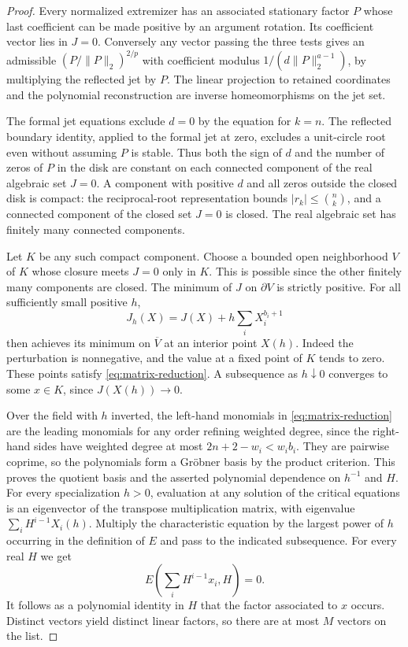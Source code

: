 \documentclass[11pt]{article}
\begin{document}
\begin{proof}
Every normalized extremizer has an associated stationary factor
\(P\) whose last coefficient can be made positive by an argument
rotation. Its coefficient vector lies in \(J=0\).
Conversely any vector passing the three tests gives an admissible
\((P/\|P\|_2)^{2/p}\) with coefficient modulus
\(1/(d\|P\|_2^{a-1})\), by multiplying the reflected jet by \(P\). The linear projection to retained coordinates and the polynomial reconstruction are inverse homeomorphisms on the jet set.

The formal jet equations exclude \(d=0\) by the equation for
\(k=n\). The reflected boundary identity, applied to the formal
jet at zero, excludes a unit-circle root even without assuming
\(P\) is stable. Thus both the sign of \(d\) and the number of
zeros of \(P\) in the disk are constant on each connected
component of the real algebraic set \(J=0\). A component with
positive \(d\) and all zeros outside the closed disk is compact:
the reciprocal-root representation bounds
\(\lvert r_k\rvert\leq\binom nk\), and a connected component
of the closed set \(J=0\) is closed. The real algebraic set has
finitely many connected components.

Let \(K\) be any such compact component. Choose a bounded open
neighborhood \(V\) of \(K\) whose closure meets \(J=0\) only in
\(K\). This is possible since the other finitely many components
are closed. The minimum of \(J\) on \(\partial V\) is strictly
positive. For all sufficiently small positive \(h\),
\[
 J_h(X)=J(X)+h\sum_i X_i^{b_i+1}
\]
then achieves its minimum on \(\overline V\) at an interior
point \(X(h)\). Indeed the perturbation is nonnegative, and the
value at a fixed point of \(K\) tends to zero. These points
satisfy \eqref{eq:matrix-reduction}. A subsequence as \(h\downarrow0\)
converges to some \(x\in K\), since \(J(X(h))\to0\).

Over the field with \(h\) inverted, the left-hand monomials in
\eqref{eq:matrix-reduction} are the leading monomials for any
order refining weighted degree, since the right-hand sides
have weighted degree at most \(2n+2-w_i<w_i b_i\). They are pairwise coprime, so the
polynomials form a Gr\"obner basis by the product criterion.
This proves the quotient basis and the asserted polynomial
dependence on \(h^{-1}\) and \(H\). For every specialization
\(h>0\), evaluation at any solution of the critical equations is
an eigenvector of the transpose multiplication matrix, with
eigenvalue \(\sum_i H^{i-1}X_i(h)\). Multiply the characteristic
equation by the largest power of \(h\) occurring in the
definition of \(E\) and pass to the indicated subsequence.
For every real \(H\) we get
\[
 E\left(\sum_i H^{i-1}x_i,H\right)=0.
\]
It follows as a polynomial identity in \(H\) that the factor
associated to \(x\) occurs. Distinct vectors yield distinct
linear factors, so there are at most \(M\) vectors on the list.


\end{proof}
\end{document}
